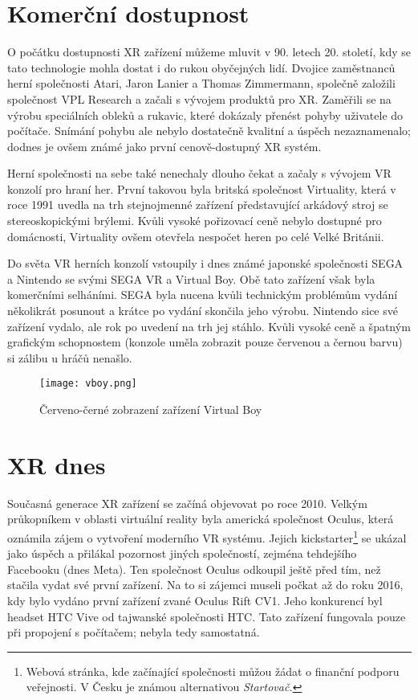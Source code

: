 \section{Komerční dostupnost}

O počátku dostupnosti XR zařízení můžeme mluvit v 90. letech 20. století, kdy se tato technologie mohla dostat i do rukou obyčejných lidí. Dvojice zaměstnanců herní společnosti Atari, Jaron Lanier a Thomas Zimmermann, společně založili společnost VPL Research a začali s vývojem produktů pro XR. Zaměřili se na výrobu speciálních obleků a rukavic, které dokázaly přenést pohyby uživatele do počítače. Snímání pohybu ale nebylo dostatečně kvalitní a úspěch nezaznamenalo; dodnes je ovšem známé jako první cenově-dostupný XR systém. \cite{otechnice_2}

Herní společnosti na sebe také nenechaly dlouho čekat a začaly s vývojem VR konzolí pro hraní her. První takovou byla britská společnost Virtuality, která v roce 1991 uvedla na trh stejnojmenné zařízení představující arkádový stroj se stereoskopickými brýlemi. Kvůli vysoké pořizovací ceně nebylo dostupné pro domácnosti, Virtuality ovšem otevřela nespočet heren po celé Velké Británii. \cite{otechnice_2} \cite{independent_virtuality}

Do světa VR herních konzolí vstoupily i dnes známé japonské společnosti SEGA a Nintendo se svými SEGA VR a Virtual Boy. Obě tato zařízení však byla komerčními selháními. SEGA byla nucena kvůli technickým problémům vydání několikrát posunout a krátce po vydání skončila jeho výrobu. Nintendo sice své zařízení vydalo, ale rok po uvedení na trh jej stáhlo. Kvůli vysoké ceně a špatným grafickým schopnostem (konzole uměla zobrazit pouze červenou a černou barvu) si zálibu u hráčů nenašlo.\cite{otechnice_2}

\begin{figure}[H]
    \centering
    \texttt{[image: vboy.png]}
    \caption{Červeno-černé zobrazení zařízení Virtual Boy \cite{vboy}}
    \label{vboy_red_display}
\end{figure}

\section{XR dnes}

Současná generace XR zařízení se začíná objevovat po roce 2010. Velkým průkopníkem v oblasti virtuální reality byla americká společnost Oculus, která oznámila zájem o vytvoření moderního VR systému. Jejich kickstarter\footnote{Webová stránka, kde začínající společnosti můžou žádat o finanční podporu veřejnosti. V Česku je známou alternativou \em Startovač.} se ukázal jako úspěch a přilákal pozornost jiných společností, zejména tehdejšího Facebooku (dnes Meta). Ten společnost Oculus odkoupil ještě před tím, než stačila vydat své první zařízení. Na to si zájemci museli počkat až do roku 2016, kdy bylo vydáno první zařízení zvané Oculus Rift CV1. Jeho konkurencí byl headset HTC Vive od tajwanské společnosti HTC. Tato zařízení fungovala pouze při propojení s počítačem; nebyla tedy samostatná. \cite{otechnice_3}

